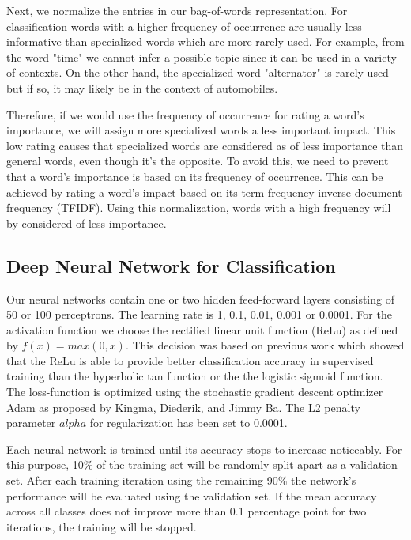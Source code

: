\documentclass[sigconf]{acmart}
\begin{document}
Next, we normalize the entries in our bag-of-words representation. For classification words with a higher frequency of occurrence are usually less informative than specialized words which are more rarely used. For example, from the word "time" we cannot infer a possible topic since it can be used in a variety of contexts. On the other hand, the specialized word "alternator" is rarely used but if so, it may likely be in the context of automobiles.

Therefore, if we would use the frequency of occurrence for rating a word's importance, we will assign more specialized words a less important impact. This low rating causes that specialized words are considered as of less importance than general words, even though it's the opposite. To avoid this, we need to prevent that a word's importance is based on its frequency of occurrence. This can be achieved by rating a word's impact based on its term frequency-inverse document frequency (TFIDF). Using this normalization, words with a high frequency will by considered of less importance.

\subsection{Deep Neural Network for Classification}

Our neural networks contain one or two hidden feed-forward layers consisting of 50 or 100 perceptrons. The learning rate is 1, 0.1, 0.01, 0.001 or 0.0001. For the activation function we choose the rectified linear unit function (ReLu) as defined by $f(x) = max(0, x)$. This decision was based on previous work which showed that the ReLu is able to provide better classification accuracy in supervised training than the hyperbolic tan function or the the logistic sigmoid function\cite{pmlr-v15-glorot11a}. The loss-function is optimized using the stochastic gradient descent optimizer Adam as proposed by Kingma, Diederik, and Jimmy Ba\cite{adam}. The L2 penalty parameter $alpha$ for regularization has been set to 0.0001.

Each neural network is trained until its accuracy stops to increase noticeably. For this purpose, 10\% of the training set will be randomly split apart as a validation set. After each training iteration using the remaining 90\% the network's performance will be evaluated using the validation set. If the mean accuracy across all classes does not improve more than 0.1 percentage point for two iterations, the training will be stopped. 
\end{document}
